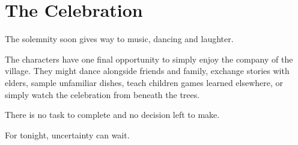 \section*{The Celebration}
{\entryfont The solemnity soon gives way to music, dancing and laughter.

The characters have one final opportunity to simply enjoy the company of the village. They might dance alongside friends and family, exchange stories with elders, sample unfamiliar dishes, teach children games learned elsewhere, or simply watch the celebration from beneath the trees.

There is no task to complete and no decision left to make.

For tonight, uncertainty can wait.}